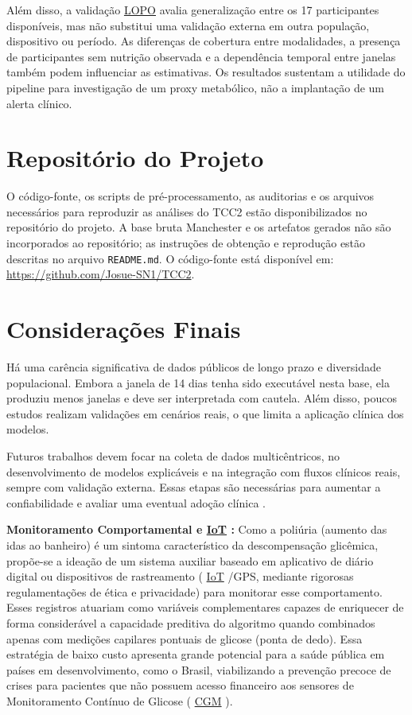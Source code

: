 \documentclass[12pt,a4paper]{article}
\DeclareRobustCommand{\sigla}[1]{%
    \texorpdfstring{\hyperlink{sigla:#1}{#1}}{#1}%
}
\begin{document}
Além disso, a validação \sigla{LOPO} avalia generalização entre os 17
participantes disponíveis, mas não substitui uma validação externa em outra
população, dispositivo ou período. As diferenças de cobertura entre
modalidades, a presença de participantes sem nutrição observada e a
dependência temporal entre janelas também podem influenciar as estimativas.
Os resultados sustentam a utilidade do pipeline para investigação de um proxy
metabólico, não a implantação de um alerta clínico.

\section{Repositório do Projeto}
O código-fonte, os scripts de pré-processamento, as auditorias e os arquivos
necessários para reproduzir as análises do TCC2 estão disponibilizados no
repositório do projeto. A base bruta Manchester e os artefatos gerados não são
incorporados ao repositório; as instruções de obtenção e reprodução estão
descritas no arquivo \texttt{README.md}. O código-fonte está disponível em:
\url{https://github.com/Josue-SN1/TCC2}.

\section{Considerações Finais}

Há uma carência significativa de dados públicos de longo prazo e diversidade
populacional. Embora a janela de 14 dias tenha sido executável nesta base, ela
produziu menos janelas e deve ser interpretada com cautela. Além disso, poucos
estudos realizam validações em cenários reais, o que limita a aplicação clínica
dos modelos.

Futuros trabalhos devem focar na coleta de dados multicêntricos, no
desenvolvimento de modelos explicáveis e na integração com fluxos clínicos
reais, sempre com validação externa. Essas etapas são necessárias para aumentar
a confiabilidade e avaliar uma eventual adoção clínica
\cite[p.~12]{alsamhori2025}.

\textbf{Monitoramento Comportamental e \sigla{IoT}:} Como a poliúria (aumento das idas ao banheiro) é um sintoma característico da descompensação glicêmica, propõe-se a ideação de um sistema auxiliar baseado em aplicativo de diário digital ou dispositivos de rastreamento (\sigla{IoT}/GPS, mediante rigorosas regulamentações de ética e privacidade) para monitorar esse comportamento. Esses registros atuariam como variáveis complementares capazes de enriquecer de forma considerável a capacidade preditiva do algoritmo quando combinados apenas com medições capilares pontuais de glicose (ponta de dedo). Essa estratégia de baixo custo apresenta grande potencial para a saúde pública em países em desenvolvimento, como o Brasil, viabilizando a prevenção precoce de crises para pacientes que não possuem acesso financeiro aos sensores de Monitoramento Contínuo de Glicose (\sigla{CGM}).

\newpage

\end{document}
